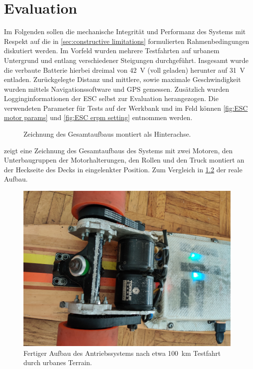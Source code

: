 \chapter{Evaluation}
	Im Folgenden sollen die mechanische Integrität und Performanz des Systems mit Respekt auf die in \cref{sec:constructive limitations} formulierten Rahmenbedingungen diskutiert werden.
	Im Vorfeld wurden mehrere Testfahrten auf urbanem Untergrund und entlang verschiedener Steigungen durchgeführt.
	Insgesamt wurde die verbaute Batterie hierbei dreimal von \qty{42}{\volt} (voll geladen) herunter auf \qty{31}{\volt} entladen.
	Zurückgelegte Distanz und mittlere, sowie maximale Geschwindigkeit wurden mittels Navigationssoftware und GPS gemessen.
	Zusätzlich wurden Logginginformationen der ESC selbst zur Evaluation herangezogen.
	Die verwendeten Parameter für Tests auf der Werkbank und im Feld können \cref{fig:ESC motor params} und \cref{fig:ESC erpm setting} entnommen werden.

	\begin{figure}[h]
		\centering
		
		\caption[Zeichnung des Gesamtaufbaus]{Zeichnung des Gesamtaufbaus montiert als Hinterachse.}
		\label{fig:drivetrain inclined}
	\end{figure}

	 zeigt eine Zeichnung des Gesamtaufbaus des Systems mit zwei Motoren, den Unterbaugruppen der Motorhalterungen, den Rollen und den Truck montiert an der Heckseite des Decks in eingelenkter Position.
	Zum Vergleich in \cref{fig:real world assembly} der reale Aufbau.
	\begin{figure}[h]
		\centering
		\includegraphics[angle=180, width=.5\textwidth]{Footage/Pictures/Drivetrain close up v2.jpg}
		\caption[Fertiger Aufbau des Antriebssystems]{Fertiger Aufbau des Antriebssystems nach etwa \qty{100}{\kilo\metre} Testfahrt durch urbanes Terrain.}
		\label{fig:real world assembly}
	\end{figure}
